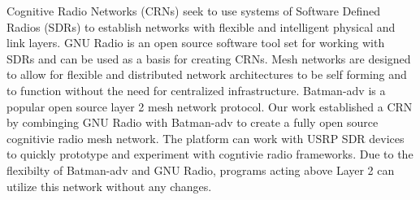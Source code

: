 Cognitive Radio Networks (CRNs) seek to use systems of Software Defined Radios (SDRs) to establish
networks with flexible and intelligent physical and link layers. GNU Radio is an open source software
tool set for working with SDRs and can be used as a basis for creating CRNs.
Mesh networks are designed to allow for flexible and 
distributed network architectures to be self forming and to function without
the need for centralized infrastructure. Batman-adv is a popular open source layer 2 mesh network
protocol. Our work established a CRN by combinging GNU Radio with Batman-adv to create a fully open
source cognitivie radio mesh network. The platform can work with USRP SDR devices to quickly
prototype and experiment with cogntivie radio frameworks. Due to the flexibilty of Batman-adv
and GNU Radio, programs acting above Layer 2 can utilize this network without any changes.  

